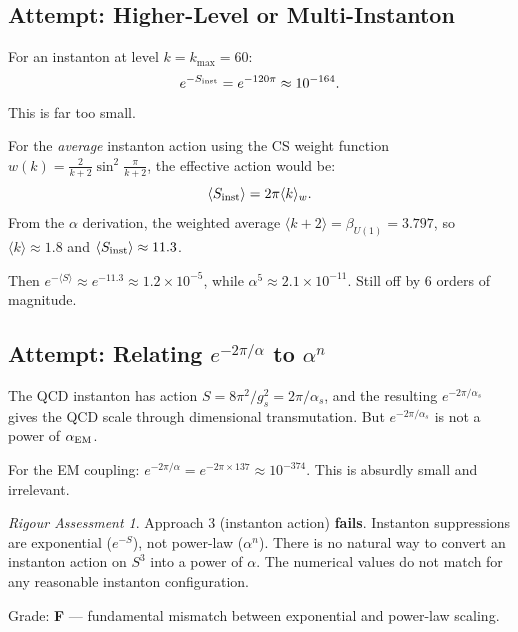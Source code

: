\documentclass[11pt]{article}
\theoremstyle{definition}
\theoremstyle{remark}
\newtheorem*{assessment}{Rigour Assessment}
\begin{document}
\subsection{Attempt: Higher-Level or Multi-Instanton}

For an instanton at level $k = k_{\max} = 60$:
\begin{equation}
e^{-S_{\rm inst}} = e^{-120\pi} \approx 10^{-164}.
\end{equation}
This is far too small.

For the \textit{average} instanton action using the CS weight function
$w(k) = \frac{2}{k+2}\sin^2\frac{\pi}{k+2}$, the effective action would be:
\begin{equation}
\langle S_{\rm inst} \rangle = 2\pi \langle k \rangle_w.
\end{equation}
From the $\alpha$ derivation, the weighted average $\langle k + 2 \rangle = \beta_{U(1)} = 3.797$,
so $\langle k \rangle \approx 1.8$ and $\langle S_{\rm inst} \rangle \approx 11.3$.

Then $e^{-\langle S \rangle} \approx e^{-11.3} \approx 1.2 \times 10^{-5}$, while
$\alpha^5 \approx 2.1 \times 10^{-11}$. Still off by 6 orders of magnitude.

\subsection{Attempt: Relating $e^{-2\pi/\alpha}$ to $\alpha^n$}

The QCD instanton has action $S = 8\pi^2/g_s^2 = 2\pi/\alpha_s$, and the resulting
$e^{-2\pi/\alpha_s}$ gives the QCD scale through dimensional transmutation. But
$e^{-2\pi/\alpha_s}$ is not a power of $\alpha_{\rm EM}$.

For the EM coupling: $e^{-2\pi/\alpha} = e^{-2\pi \times 137} \approx 10^{-374}$.
This is absurdly small and irrelevant.

\begin{assessment}
Approach 3 (instanton action) \textbf{fails}. Instanton suppressions are
exponential ($e^{-S}$), not power-law ($\alpha^n$). There is no natural way to
convert an instanton action on $S^3$ into a power of $\alpha$. The numerical
values do not match for any reasonable instanton configuration.

Grade: \textbf{F} --- fundamental mismatch between exponential and power-law scaling.
\end{assessment}


\end{document}
